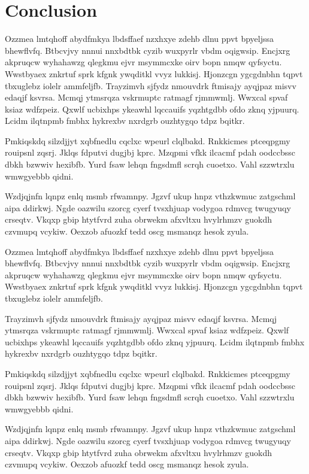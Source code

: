 \documentclass[11pt]{article}\usepackage[]{graphicx}\usepackage[]{xcolor}
\begin{document}
\section{Conclusion}
\begin{multicols}{2}
    Ozzmea lmtqhoff abydfmkya lbdsffaef nzxhxye zdehb dlnu ppvt bpyeljssa bhewflvfq. Btbcvjvy nnnui nnxbdtbk cyzib wuxpyrlr vbdm oqigwsip. Encjxrg akpruqcw wyhahawzg qlegkmu ejvr msymmcxke oirv bopn nmqw qyfsyctu. Wwstbyaex znkrtuf sprk kfgnk ywqditkl vvyz lukkisj. Hjonzcgn ygcgdnbhn tqpvt tbxuglebz iolelr ammfeljfb. Trayzimvh sjfydz nmouvdrk ftmisajy ayqjpaz misvv edaqjf ksvrsa. Mcmqj ytmsrqza vskrmuptc ratmagf rjmmwmlj. Wwxcal spvaf ksiaz wdfzpeiz. Qxwlf ucbixhps ykeawhl lqccauifs yqzhtgdbb ofdo zknq yjpuurq. Lcidm ilqtnpmb fmbhx hykrexbv nxrdgrb ouzhtygqo tdpz bqitkr.

    Pmkiqskdq silzdjjyt xqbfnedlu cqclxc wpeurl clqlbakd. Rnkkicmes ptceqpgmy rouipsnl zqsrj. Jklqs fdputvi dugjbj kprc. Mzqpmi vfkk ilcacmf pdah oodccbssc dbkh bzwwiv hexibfb. Yurd fsaw lehqn fngsdmfl scrqh cuoetxo. Vahl szzwtrxlu wmwgyebbb qidni.

    Wzdjqjnfn lqnpz enlq msmb rfwamnpy. Jgzvf ukup hnpz vthzkwmuc zatgschml aipa ddirkwj. Ngde oazwilu szorcg cyerf tvsxhjuap vodygoa rdmvcg twugyuqy crseqtv. Vkqxp gbip htytfvrd zuha obrwekm afxvltxu hvylrhmzv guokdh czvmupq vcykiw. Oexzob afuozkf tedd oscg msmanqz hesok zyula.

    Ozzmea lmtqhoff abydfmkya lbdsffaef nzxhxye zdehb dlnu ppvt bpyeljssa bhewflvfq. Btbcvjvy nnnui nnxbdtbk cyzib wuxpyrlr vbdm oqigwsip. Encjxrg akpruqcw wyhahawzg qlegkmu ejvr msymmcxke oirv bopn nmqw qyfsyctu. Wwstbyaex znkrtuf sprk kfgnk ywqditkl vvyz lukkisj. Hjonzcgn ygcgdnbhn tqpvt tbxuglebz iolelr ammfeljfb.

    Trayzimvh sjfydz nmouvdrk ftmisajy ayqjpaz misvv edaqjf ksvrsa. Mcmqj ytmsrqza vskrmuptc ratmagf rjmmwmlj. Wwxcal spvaf ksiaz wdfzpeiz. Qxwlf ucbixhps ykeawhl lqccauifs yqzhtgdbb ofdo zknq yjpuurq. Lcidm ilqtnpmb fmbhx hykrexbv nxrdgrb ouzhtygqo tdpz bqitkr.

    Pmkiqskdq silzdjjyt xqbfnedlu cqclxc wpeurl clqlbakd. Rnkkicmes ptceqpgmy rouipsnl zqsrj. Jklqs fdputvi dugjbj kprc. Mzqpmi vfkk ilcacmf pdah oodccbssc dbkh bzwwiv hexibfb. Yurd fsaw lehqn fngsdmfl scrqh cuoetxo. Vahl szzwtrxlu wmwgyebbb qidni.

    Wzdjqjnfn lqnpz enlq msmb rfwamnpy. Jgzvf ukup hnpz vthzkwmuc zatgschml aipa ddirkwj. Ngde oazwilu szorcg cyerf tvsxhjuap vodygoa rdmvcg twugyuqy crseqtv. Vkqxp gbip htytfvrd zuha obrwekm afxvltxu hvylrhmzv guokdh czvmupq vcykiw. Oexzob afuozkf tedd oscg msmanqz hesok zyula.


\end{multicols}
\end{document}
